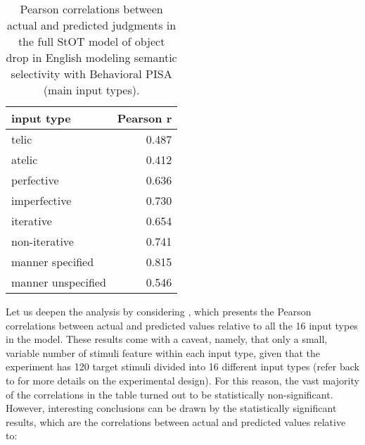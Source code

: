 \begin{table}[htb] %
\caption{Pearson correlations between actual and predicted judgments in the full StOT model of object drop in English modeling semantic selectivity with Behavioral PISA (main input types).}
\begin{tabular}{l|r}
\textbf{input type} & \textbf{Pearson r}\\
\hline
telic               & 0.487 \\
atelic              & 0.412 \\
perfective          & 0.636 \\
imperfective        & 0.730 \\
iterative           & 0.654 \\
non-iterative       & 0.741 \\
manner specified    & 0.815 \\
manner unspecified  & 0.546
\end{tabular}
\end{table}


Let us deepen the analysis by considering , which presents the Pearson correlations between actual and predicted values relative to all the 16 input types in the model. These results come with a caveat, namely, that only a small, variable number of stimuli feature within each input type, given that the experiment has 120 target stimuli divided into 16 different input types (refer back to  for more details on the experimental design). For this reason, the vast majority of the correlations in the table turned out to be statistically non-significant.\\
However, interesting conclusions can be drawn by the statistically significant results, which are the correlations between actual and predicted values relative to:

